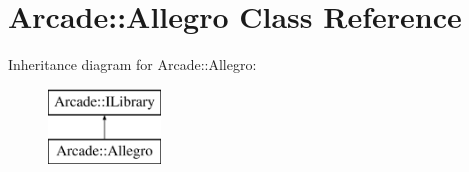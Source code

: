 \hypertarget{class_arcade_1_1_allegro}{}\section{Arcade\+:\+:Allegro Class Reference}
\label{class_arcade_1_1_allegro}
Inheritance diagram for Arcade\+:\+:Allegro\+:\begin{figure}[H]
\begin{center}
\leavevmode
\includegraphics[height=2.000000cm]{class_arcade_1_1_allegro}
\end{center}
\end{figure}
